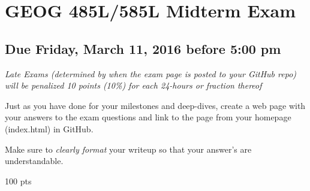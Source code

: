 \documentclass[]{article}
\author{}
\date{}
\begin{document}
\section{GEOG 485L/585L Midterm Exam}\label{geog-485l585l-midterm-exam}

\subsection{Due Friday, March 11, 2016 before 5:00
pm}\label{due-friday-march-11-2016-before-500-pm}

\emph{Late Exams (determined by when the exam page is posted to your
GitHub repo) will be penalized 10 points (10\%) for each 24-hours or
fraction thereof}

Just as you have done for your milestones and deep-dives, create a web
page with your answers to the exam questions and link to the page from
your homepage (index.html) in GitHub.

Make sure to \emph{clearly format} your writeup so that your answer's
are understandable.

100 pts
\end{document}
